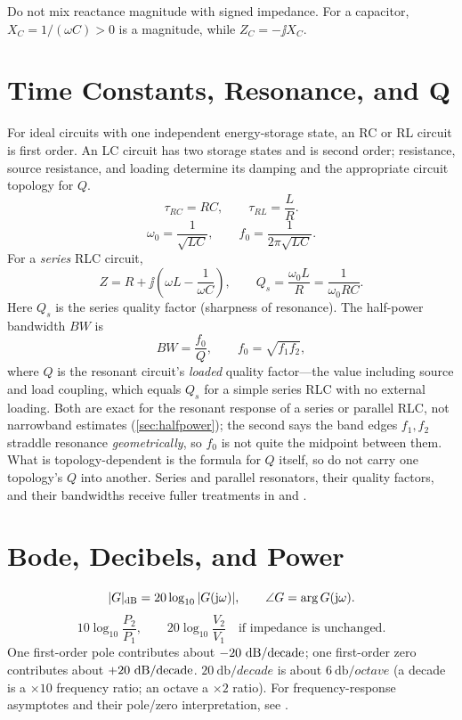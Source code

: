 \begin{mistakebox}
Do not mix reactance magnitude with signed impedance. For a capacitor,
\(X_C=1/(\omega C)>0\) is a magnitude, while \(Z_C=-\jj X_C\).
\end{mistakebox}

\section{Time Constants, Resonance, and Q}
For ideal circuits with one independent energy-storage state, an RC or RL circuit
is first order. An LC circuit has two storage states and is second order; resistance,
source resistance, and loading determine its damping and the appropriate circuit
topology for \(Q\).
\[
\tau_{RC}=RC,\qquad \tau_{RL}=\frac{L}{R}.
\]
\[
\omega_0=\frac{1}{\sqrt{LC}},
\qquad
f_0=\frac{1}{2\pi\sqrt{LC}}.
\]
For a \emph{series} RLC circuit,
\[
Z=R+\jj\left(\omega L-\frac{1}{\omega C}\right),
\qquad
Q_s=\frac{\omega_0 L}{R}=\frac{1}{\omega_0 R C}.
\]
Here \(Q_s\) is the series quality factor (sharpness of resonance). The half-power
bandwidth \(BW\) is
\[
BW=\frac{f_0}{Q},
\qquad
f_0=\sqrt{f_1f_2},
\]
where \(Q\) is the resonant circuit's \emph{loaded} quality factor---the value
including source and load coupling, which equals \(Q_s\) for a simple series RLC
with no external loading. Both are exact for the resonant response of a series or
parallel RLC, not narrowband estimates (\cref{sec:halfpower}); the second says the
band edges \(f_1,f_2\) straddle resonance \emph{geometrically}, so \(f_0\) is not
quite the midpoint between them. What is topology-dependent is the formula for \(Q\)
itself, so do not carry one topology's \(Q\) into another. Series and parallel
resonators, their quality factors, and their bandwidths receive fuller treatments in
\cite[pp.~59--67]{white2004highfrequency} and
\cite[pp.~23--35]{bowick2008rfcircuit}.

\section{Bode, Decibels, and Power}
\[
|G|_{\mathrm{dB}}=20\log_{10}|G(\mathrm{j}\omega)|,
\qquad
\angle G=\arg G(\mathrm{j}\omega).
\]
\[
10\log_{10}\frac{P_2}{P_1},\qquad
20\log_{10}\frac{V_2}{V_1}\quad \text{if impedance is unchanged.}
\]
One first-order pole contributes about \(-20~\mathrm{dB}/\mathrm{decade}\); one
first-order zero contributes about \(+20~\mathrm{dB}/\mathrm{decade}\).
\(\SI{20}{\decibel/decade}\) is about \(\SI{6}{\decibel/octave}\) (a decade is a
\(\times10\) frequency ratio; an octave a \(\times2\) ratio).
For frequency-response asymptotes and their pole/zero interpretation, see
\cite[pp.~47--61]{leigh2012control}.

